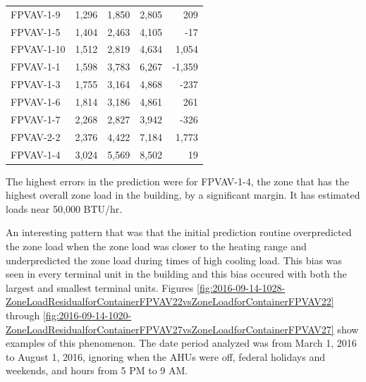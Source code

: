 \begin{table}[]
\begin{tabular}{lrrrr}
FPVAV-1-9  & 1,296 & 1,850 & 2,805  & 209    \\
FPVAV-1-5  & 1,404 & 2,463 & 4,105  & -17    \\
FPVAV-1-10 & 1,512 & 2,819 & 4,634  & 1,054  \\
FPVAV-1-1  & 1,598 & 3,783 & 6,267  & -1,359 \\
FPVAV-1-3  & 1,755 & 3,164 & 4,868  & -237   \\
FPVAV-1-6  & 1,814 & 3,186 & 4,861  & 261    \\
FPVAV-1-7  & 2,268 & 2,827 & 3,942  & -326   \\
FPVAV-2-2  & 2,376 & 4,422 & 7,184  & 1,773  \\
FPVAV-1-4  & 3,024 & 5,569 & 8,502  & 19     \\
    \bottomrule
\end{tabular}
\end{table}

The highest errors in the prediction were for FPVAV-1-4, the zone that
has the highest overall zone load in the building, by a significant
margin. It has estimated loads near 50,000 BTU/hr.



An interesting pattern that was that the initial prediction routine
overpredicted the zone load when the zone load was closer to the heating range
and underpredicted the zone load during times of high cooling load. This bias
was seen in every terminal unit in the building and this bias occured with both
the largest and smallest terminal units. Figures
\ref{fig:2016-09-14-1028-ZoneLoadResidualforContainerFPVAV22vsZoneLoadforContainerFPVAV22}
through
\ref{fig:2016-09-14-1020-ZoneLoadResidualforContainerFPVAV27vsZoneLoadforContainerFPVAV27}
show examples of this phenomenon. The date period analyzed was from March 1,
2016 to August 1, 2016, ignoring when the AHUs were off, federal holidays and
weekends, and hours from 5 PM to 9 AM. 

\newcommand{\zoneLoadCaption}[1]{Bias in zone load prediction for #1.}

